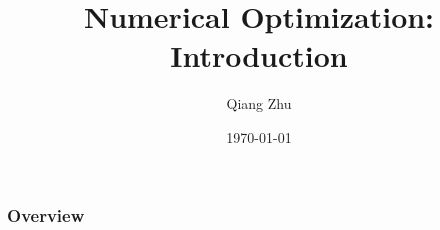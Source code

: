 \documentclass{beamer}
\title[Optimization]{Numerical Optimization: Introduction} %
\author{Qiang Zhu} %
\institute[University of Nevada Las Vegas] %
{
University of Nevada Las Vegas\\ %
\medskip
}
\date{\today} %
\begin{document}
\begin{frame}
\titlepage %
\end{frame}

\begin{frame}
\frametitle{Overview} %
\tableofcontents %
\end{frame}


\end{document}
